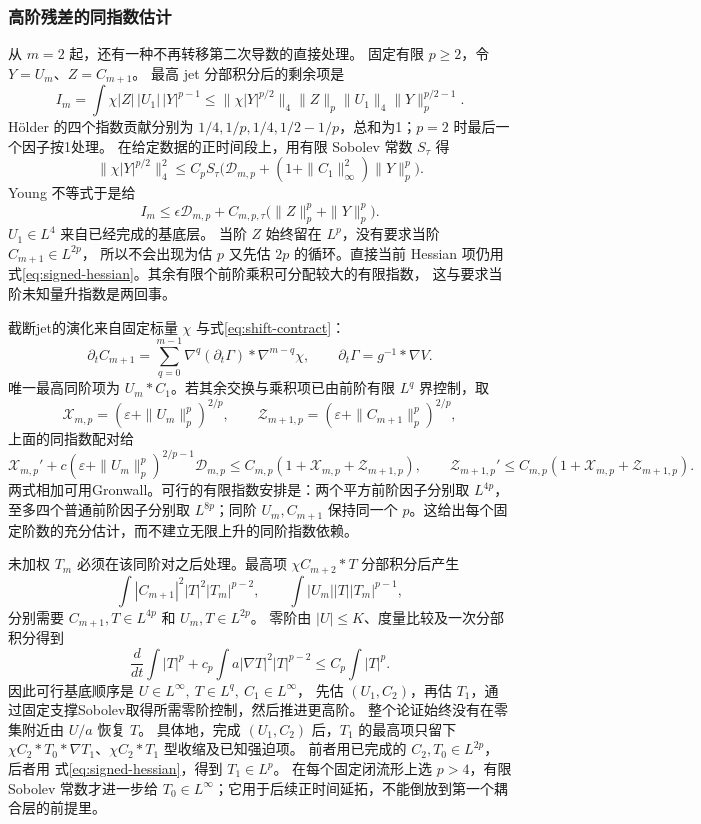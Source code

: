 \documentclass[UTF8,a4paper,11pt,fontset=fandol]{ctexart}
\numberwithin{equation}{section}
\theoremstyle{definition}
\begin{document}
\subsubsection{高阶残差的同指数估计}\label{sec:jet-same-exponent}
从 $m=2$ 起，还有一种不再转移第二次导数的直接处理。
固定有限 $p\ge2$，令 $Y=U_m$、$Z=C_{m+1}$。
最高 jet 分部积分后的剩余项是
\[
I_m=\int\chi|Z|\,|U_1|\,|Y|^{p-1}
\le\|\chi|Y|^{p/2}\|_4\|Z\|_p\|U_1\|_4
\|Y\|_p^{p/2-1}.
\]
H\"older 的四个指数贡献分别为
$1/4,1/p,1/4,1/2-1/p$，总和为1；$p=2$ 时最后一个因子按1处理。
在给定数据的正时间段上，用有限 Sobolev 常数 $S_\tau$ 得
\[
\|\chi|Y|^{p/2}\|_4^2
\le C_pS_\tau\bigl(\mathcal D_{m,p}+
(1+\|C_1\|_\infty^2)\|Y\|_p^p\bigr).
\]
Young 不等式于是给
\begin{equation}\label{eq:same-exponent-residual}
I_m\le\epsilon\mathcal D_{m,p}
+C_{m,p,\tau}\bigl(\|Z\|_p^p+\|Y\|_p^p\bigr).
\end{equation}
$U_1\in L^4$ 来自已经完成的基底层。
当阶 $Z$ 始终留在 $L^p$，没有要求当阶 $C_{m+1}\in L^{2p}$，
所以不会出现为估 $p$ 又先估 $2p$ 的循环。直接当前 Hessian 项仍用
式\eqref{eq:signed-hessian}。其余有限个前阶乘积可分配较大的有限指数，
这与要求当阶未知量升指数是两回事。

截断jet的演化来自固定标量 $\chi$ 与式\eqref{eq:shift-contract}：
\[
\partial_tC_{m+1}
=\sum_{q=0}^{m-1}\nabla^q(\partial_t\Gamma)*\nabla^{m-q}\chi,
\qquad \partial_t\Gamma=g^{-1}*\nabla V.
\]
唯一最高同阶项为 $U_m*C_1$。若其余交换与乘积项已由前阶有限 $L^q$ 界控制，取
\[
\mathcal X_{m,p}=(\varepsilon+\|U_m\|_p^p)^{2/p},\qquad
\mathcal Z_{m+1,p}=(\varepsilon+\|C_{m+1}\|_p^p)^{2/p},
\]
上面的同指数配对给
\[
\mathcal X_{m,p}'+c(\varepsilon+\|U_m\|_p^p)^{2/p-1}\mathcal D_{m,p}
\le C_{m,p}(1+\mathcal X_{m,p}+\mathcal Z_{m+1,p}),\qquad
\mathcal Z_{m+1,p}'\le C_{m,p}(1+\mathcal X_{m,p}+\mathcal Z_{m+1,p}).
\]
两式相加可用Gronwall。可行的有限指数安排是：两个平方前阶因子分别取 $L^{4p}$，至多四个普通前阶因子分别取 $L^{8p}$；同阶 $U_m,C_{m+1}$ 保持同一个 $p$。这给出每个固定阶数的充分估计，而不建立无限上升的同阶指数依赖。

未加权 $T_m$ 必须在该同阶对之后处理。最高项
$\chi C_{m+2}*T$ 分部积分后产生
\[
\int|C_{m+1}|^2|T|^2|T_m|^{p-2},\qquad
\int|U_m||T||T_m|^{p-1},
\]
分别需要 $C_{m+1},T\in L^{4p}$ 和 $U_m,T\in L^{2p}$。
零阶由 $|U|\le K$、度量比较及一次分部积分得到
\[
\frac d{dt}\int|T|^p+c_p\int a|\nabla T|^2|T|^{p-2}
\le C_p\int|T|^p.
\]
因此可行基底顺序是
$U\in L^\infty,\ T\in L^q,\ C_1\in L^\infty$，
先估 $(U_1,C_2)$，再估 $T_1$，通过固定支撑Sobolev取得所需零阶控制，然后推进更高阶。
整个论证始终没有在零集附近由 $U/a$ 恢复 $T$。
具体地，完成 $(U_1,C_2)$ 后，$T_1$ 的最高项只留下
$\chi C_2*T_0*\nabla T_1$、$\chi C_2*T_1$ 型收缩及已知强迫项。
前者用已完成的 $C_2,T_0\in L^{2p}$，后者用
式\eqref{eq:signed-hessian}，得到 $T_1\in L^p$。
在每个固定闭流形上选 $p>4$，有限 Sobolev 常数才进一步给
$T_0\in L^\infty$；它用于后续正时间延拓，不能倒放到第一个耦合层的前提里。
\end{document}
